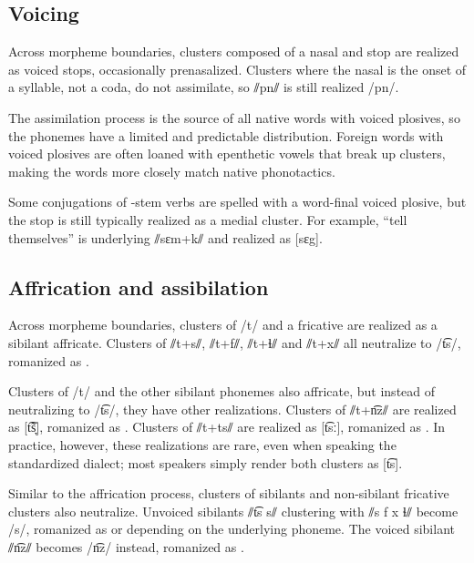 \subsection{Voicing} \label{sub:voicing}
Across morpheme boundaries, clusters composed of a nasal and stop are realized as voiced stops, occasionally prenasalized.  Clusters where the nasal is the onset of a syllable, not a coda, do not assimilate, so ⫽pn⫽ is still realized /pn/. 

The assimilation process is the source of all native words with voiced plosives, so the phonemes have a limited and predictable distribution.  Foreign words with voiced plosives are often loaned with epenthetic vowels that break up clusters, making the words more closely match native phonotactics. %

Some conjugations of -stem verbs are spelled with a word-final voiced plosive, but the stop is still typically realized as a medial cluster. For example,  “tell themselves” is underlying ⫽sɛm+k⫽ and realized as [sɛg]. 

\subsection{Affrication and assibilation} \label{sub:affrication}
Across morpheme boundaries, clusters of /t/ and a fricative are realized as a sibilant affricate. Clusters of ⫽t+s⫽, ⫽t+f⫽, ⫽t+ɬ⫽ and ⫽t+x⫽ all neutralize to /t͡s/, romanized as . 

Clusters of /t/ and the other sibilant phonemes also affricate, but instead of neutralizing to /t͡s/, they have other realizations. Clusters of ⫽t+n͡z⫽ are realized as [t͡s̞̃], romanized as .  Clusters of ⫽t+ts⫽ are realized as [t͡sː], romanized as . In practice, however, these realizations are rare, even when speaking the standardized dialect; most speakers simply render both clusters as [t͡s].

Similar to the affrication process, clusters of sibilants and non-sibilant fricative clusters also neutralize. Unvoiced sibilants ⫽t͡s s⫽ clustering with ⫽s f x ɬ⫽ become /s/, romanized as  or  depending on the underlying phoneme. The voiced sibilant ⫽n͡z⫽ becomes /n͡z/ instead, romanized as .

